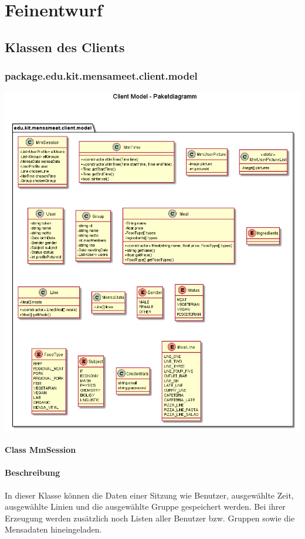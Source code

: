 \documentclass[a4paper]{scrreprt}
\begin{document}
\chapter{Feinentwurf}
\section{Klassen des Clients}


\subsection{package.edu.kit.mensameet.client.model}
\begin{center}
	\includegraphics[width=1.1\textwidth]{GUI/frontend-package-model.png}
\end{center} 


\subsubsection{Class MmSession}
\subsubsection*{Beschreibung}
In dieser Klasse können die Daten einer Sitzung wie Benutzer, ausgewählte Zeit, ausgewählte Linien und die ausgewählte Gruppe gespeichert werden. Bei ihrer Erzeugung werden zusätzlich noch Listen aller Benutzer bzw. Gruppen sowie die Mensadaten hineingeladen.
\end{document}
